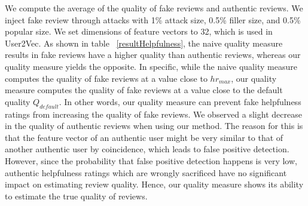 \documentclass[master,english,final]{kaist-ucs}
\begin{document}


We compute the average of the quality of fake reviews and authentic reviews.
We inject fake review through attacks with 1\% attack size, 0.5\% filler size, and 0.5\% popular size.
We set dimensions of feature vectors to 32, which is used in User2Vec.
As shown in table ~\ref{resultHelpfulness}, the naive quality measure results in fake reviews have a higher quality than authentic reviews, whereas our quality measure yields the opposite.
In specific, while the naive quality measure computes the quality of fake reviews at a value close to $hr_{max}$, our quality measure computes the quality of fake reviews at a value close to the default quality $Q_{default}$.
In other words, our quality measure can prevent fake helpfulness ratings from increasing the quality of fake reviews.
We observed a slight decrease in the quality of authentic reviews when using our method.
The reason for this is that the feature vector of an authentic user might be very similar to that of another authentic user by coincidence, which leads to false positive detection.
However, since the probability that false positive detection happens is very low, authentic helpfulness ratings which are wrongly sacrificed have no significant impact on estimating review quality.
Hence, our quality measure shows its ability to estimate the true quality of reviews.

\end{document}
